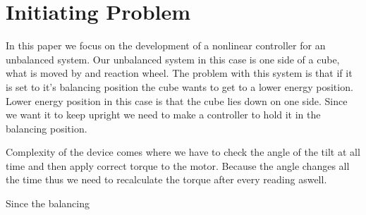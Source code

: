 \section{Initiating Problem}
In this paper we focus on the development of a nonlinear controller for an unbalanced system.
Our unbalanced system in this case is one side of a cube, what is moved by and reaction wheel.
The problem with this system is that if it is set to it's balancing position the cube wants to get to a lower energy position.
Lower energy position in this case is that the cube lies down on one side.
Since we want it to keep upright we need to make a controller to hold it in the balancing position.

Complexity of the device comes where we have to check the angle of the tilt at all time and then apply correct torque to the motor.
Because the angle changes all the time thus we need to recalculate the torque after every reading aswell.

Since the balancing 
